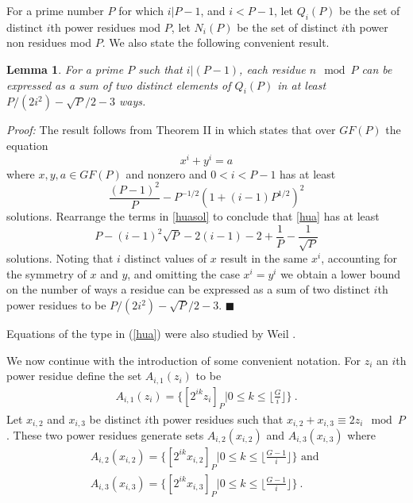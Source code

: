 \documentclass[12pt]{article} \pagestyle{plain} \topmargin
\newtheorem{lemma}{Lemma}
\begin{document}
For a prime number $P$ for which $i|P-1$, and $i<P-1$, let
$Q_i(P)$ be the set of distinct $i$th power residues mod $P$, let
$N_i(P)$ be the set of distinct $i$th power non residues mod $P$.
We also state the following convenient result.
\begin{lemma}\label{sums1}
For a prime $P$ such that $i | (P-1)$, each residue $n \mod P$ can
be expressed as a sum of two distinct elements of $Q_i(P)$ in at
least $P/(2i^2)-\sqrt{P}/2-3$ ways.
\end{lemma}
\noindent \textit{Proof:} The result follows from Theorem II in
\cite{huavan:49} which states that over $GF(P)$ the equation
\begin{equation}\label{hua} x^i+y^i=a
\end{equation} where $x,y,a \in GF(P)$ and nonzero and $0 < i <P-1 $
has at least
\begin{equation}\label{huasol}\frac{(P-1)^2}{P}-P^{-1/2}\left(1+(i-1)P^{1/2}\right)^2\end{equation}
solutions. Rearrange the terms in \eqref{huasol} to conclude that
\eqref{hua} has at least \begin{equation}\label{huasol1}
P-(i-1)^2\sqrt{P}-2(i-1)-2+\frac{1}{P}-\frac{1}{\sqrt{P}}
\end{equation} solutions. Noting that $i$ distinct values of $x$ result
in the same $x^i$, accounting for the symmetry of $x$ and $y$, and
omitting the case $x^i=y^i$ we obtain a lower bound on the number of
ways a residue can be expressed as a sum of two distinct $i$th power
residues to be $P/(2i^2)-\sqrt{P}/2-3$. \hfill$\blacksquare$

Equations of the type in (\ref{hua}) were also studied by Weil
\cite{weil:49}.




We now continue with the introduction of some convenient notation.
For $z_i$ an $i$th power residue define the set $A_{i,1}(z_i)$ to
be
\begin{eqnarray}\label{azi1}A_{i,1}(z_i)=\{[2^{ik}z_i]_P | 0 \leq k \leq
\lfloor\frac{G}{i} \rfloor \}~.\end{eqnarray} Let $x_{i,2}$ and
$x_{i,3}$ be distinct $i$th power residues such that
$x_{i,2}+x_{i,3} \equiv 2z_i \mod P$. %
These two power
residues generate sets $A_{i,2}(x_{i,2})$ and  $A_{i,3}(x_{i,3})$
where
\begin{eqnarray}\label{azi2} A_{i,2}(x_{i,2}) =\{ [2^{ik}x_{i,2}]_P| 0 \leq k \leq \lfloor
\frac{G-1}{i} \rfloor \} \text{ and }\\
\label{azi3}A_{i,3}(x_{i,3}) =\{ [2^{ik}x_{i,3}]_P| 0 \leq k \leq
\lfloor \frac{G-1}{i} \rfloor \}~.\end{eqnarray}
\end{document}
